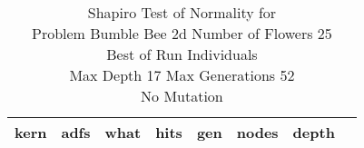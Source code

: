 \begin{table}[H]
\caption{Shapiro Test of Normality for \\ Problem  Bumble Bee 2d  Number of Flowers 25\\Best of Run Individuals \\ Max Depth 17 Max Generations 52\\ No Mutation \\}
\begin{center}
\scalebox{0.8} %
{
\begin{tabular}{lrrrrrrr}
\hline
kern & adfs & what & hits & gen & nodes & depth \\
\hline


\end{tabular}
}
\end{center}
\end{table}

